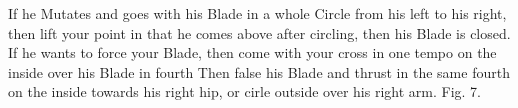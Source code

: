 \exercise{}
If he Mutates and goes with his Blade in a whole Circle from his left
to his right, then lift your point in that he comes above after
circling, then his Blade is closed. If he wants to force your Blade,
then come with your cross in one tempo on the inside over his Blade in
fourth Then false his Blade and thrust in the same fourth on the
inside towards his right hip, or cirle
outside over his right arm. Fig. 7.
